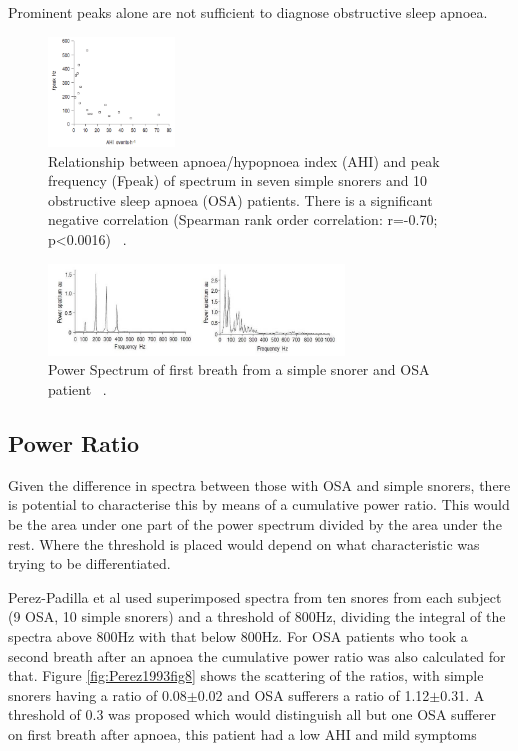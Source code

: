 Prominent peaks alone are not sufficient to diagnose obstructive sleep apnoea. 
\begin{figure}[h]
\centering 
\includegraphics[width=0.3\textwidth]{drawings/Fiz1996fig3}
\caption{Relationship between apnoea/hypopnoea index (AHI) and
peak frequency (Fpeak) of spectrum in seven simple snorers and 10
obstructive sleep apnoea (OSA) patients. There is a significant negative correlation (Spearman rank
order correlation: r=-0.70; p\textless0.0016) ~\cite{fiz1996acoustic}.}
\label{fig:Fiz1996fig3}
\end{figure}
\begin{figure}[h]
\centering 
\includegraphics[width=0.7\textwidth]{drawings/Fiz1996fig12}
\caption{Power Spectrum of first breath from a simple snorer and OSA patient ~\cite{fiz1996acoustic}.}
\label{fig:Fiz1996fig12}
\end{figure}


\subsection{Power Ratio}
Given the difference in spectra between those with OSA and simple snorers, there is potential to characterise this by means of a cumulative power ratio. This would be the area under one part of the power spectrum divided by the area under the rest. Where the threshold is placed would depend on what characteristic was trying to be differentiated. 

Perez-Padilla et al used superimposed spectra from ten snores from each subject (9 OSA, 10 simple snorers) and a threshold of 800Hz, dividing the integral of the spectra above 800Hz with that below 800Hz. For OSA patients who took a second breath after an apnoea the cumulative power ratio was also calculated for that. Figure \ref{fig:Perez1993fig8} shows the scattering of the ratios, with simple snorers having a ratio of 0.08$\pm$0.02 and OSA sufferers a ratio of 1.12$\pm$0.31. A threshold of 0.3 was proposed which would distinguish all but one OSA sufferer on first breath after apnoea, this patient had a low AHI and mild symptoms ~\cite{whitelaw1993characteristics}

